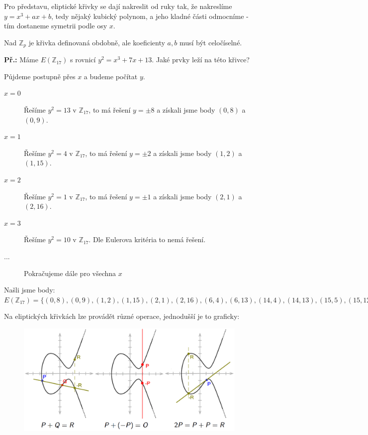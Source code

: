 Pro představu, eliptické křivky se dají nakreslit od ruky tak, že nakreslíme
$y=x^3+ax+b$, tedy nějaký kubický polynom, a jeho kladné části odmocníme -
tím dostaneme symetrii podle osy $x$.

Nad $\mathbb{Z}_p$ je křivka definovaná obdobně, ale koeficienty $a, b$ musí být
celočíselné.

\begin{exercise}
    \textbf{Př.:} Máme $E(\mathbb{Z}_{17})$ s rovnicí $y^2 = x^3 + 7x + 13$.
    Jaké prvky leží na této křivce?
    
    \noindent Půjdeme postupně přes $x$ a budeme počítat $y$.
    
    \begin{description}
    \item[$x=0$] Řešíme $y^2 = 13$ v $\mathbb{Z}_{17}$, to má řešení $y=\pm 8$ a získali jsme body $(0, 8)$ a $(0, 9)$.
    \item[$x=1$] Řešíme $y^2 = 4$ v $\mathbb{Z}_{17}$, to má řešení $y=\pm 2$ a získali jsme body $(1, 2)$ a $(1, 15)$.
    \item[$x=2$] Řešíme $y^2 = 1$ v $\mathbb{Z}_{17}$, to má řešení $y=\pm 1$ a získali jsme body $(2, 1)$ a $(2, 16)$.
    \item[$x=3$] Řešíme $y^2 = 10$ v $\mathbb{Z}_{17}$. Dle Eulerova kritéria to nemá řešení.
    \item[...] Pokračujeme dále pro všechna $x$
    \end{description}
    
	\noindent Našli jsme body: $E(\mathbb{Z}_{17}) = \{(0, 8), (0, 9), (1, 2), (1, 15), (2, 1), (2, 16), (6, 4), (6, 13), (14, 4), (14, 13), (15, 5), (15, 12)\}$
\end{exercise}

Na eliptických křivkách lze provádět různé operace, jednodušší je to graficky:

\begin{figure}[ht!]
  \centering
  \includegraphics[width=\textwidth]{MKR/img/ec-graficky.png}
\end{figure}

